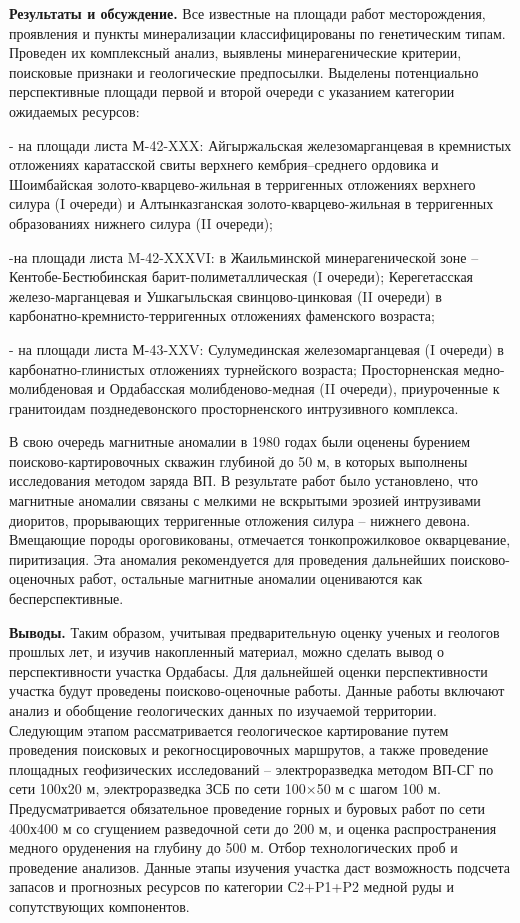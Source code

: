 {\bfseries Результаты и обсуждение.} Все известные на площади работ
месторождения, проявления и пункты минерализации классифицированы по
генетическим типам. Проведен их комплексный анализ, выявлены
минерагенические критерии, поисковые признаки и геологические
предпосылки. Выделены потенциально перспективные площади первой и второй
очереди с указанием категории ожидаемых ресурсов:

- на площади листа М-42-XXX: Айгыржальская железомарганцевая в
кремнистых отложениях каратасской свиты верхнего кембрия--среднего
ордовика и Шоимбайская золото-кварцево-жильная в терригенных отложениях
верхнего силура (I очереди) и Алтынказганская золото-кварцево-жильная в
терригенных образованиях нижнего силура (II очереди);

-на площади листа M-42-XXXVI: в Жаильминской минерагенической зоне --
Кентобе-Бестюбинская барит-полиметаллическая (I очереди); Керегетасская
железо-марганцевая и Ушкагыльская свинцово-цинковая (II очереди) в
карбонатно-кремнисто-терригенных отложениях фаменского возраста;

- на площади листа М-43-XXV: Сулумединская железомарганцевая (I очереди)
в карбонатно-глинистых отложениях турнейского возраста; Просторненская
медно-молибденовая и Ордабасская молибденово-медная (II очереди),
приуроченные к гранитоидам позднедевонского просторненского интрузивного
комплекса.

В свою очередь магнитные аномалии в 1980 годах были оценены бурением
поисково-картировочных скважин глубиной до 50 м, в которых выполнены
исследования методом заряда ВП. В результате работ было установлено, что
магнитные аномалии связаны с мелкими не вскрытыми эрозией интрузивами
диоритов, прорывающих терригенные отложения силура -- нижнего девона.
Вмещающие породы ороговикованы, отмечается тонкопрожилковое
окварцевание, пиритизация. Эта аномалия рекомендуется для проведения
дальнейших поисково-оценочных работ, остальные магнитные аномалии
оцениваются как бесперспективные.

{\bfseries Выводы.} Таким образом, учитывая предварительную оценку ученых и
геологов прошлых лет, и изучив накопленный материал, можно сделать вывод
о перспективности участка Ордабасы. Для дальнейшей оценки
перспективности участка будут проведены поисково-оценочные работы.
Данные работы включают анализ и обобщение геологических данных по
изучаемой территории. Следующим этапом рассматривается геологическое
картирование путем проведения поисковых и рекогносцировочных маршрутов,
а также проведение площадных геофизических исследований --
электроразведка методом ВП-СГ по сети 100х20 м, электроразведка ЗСБ по
сети 100×50 м с шагом 100 м. Предусматривается обязательное проведение
горных и буровых работ по сети 400х400 м со сгущением разведочной сети
до 200 м, и оценка распространения медного оруденения на глубину до 500
м. Отбор технологических проб и проведение анализов. Данные этапы
изучения участка даст возможность подсчета запасов и прогнозных ресурсов
по категории С2+P1+P2 медной руды и сопутствующих компонентов.


